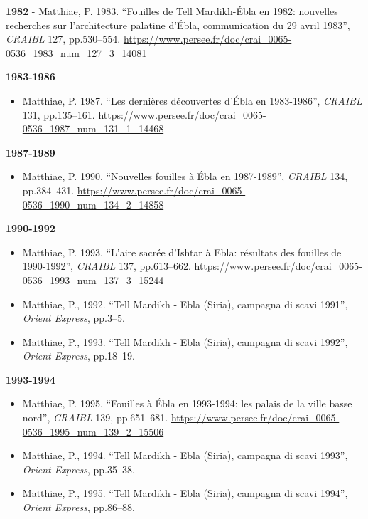 \documentclass[
]{book}
\providecommand{\tightlist}{%
  \setlength{\itemsep}{0pt}\setlength{\parskip}{0pt}}
\begin{document}
\textbf{1982}
- Matthiae, P. 1983. ``Fouilles de Tell Mardikh-Ébla en 1982: nouvelles recherches sur l'architecture palatine d'Ébla, communication du 29 avril 1983'', \emph{CRAIBL} 127, pp.530--554. \url{https://www.persee.fr/doc/crai_0065-0536_1983_num_127_3_14081}

\textbf{1983-1986}

\begin{itemize}
\tightlist
\item
  Matthiae, P. 1987. ``Les dernières découvertes d'Ébla en 1983-1986'', \emph{CRAIBL} 131, pp.135--161. \url{https://www.persee.fr/doc/crai_0065-0536_1987_num_131_1_14468}
\end{itemize}

\textbf{1987-1989}

\begin{itemize}
\tightlist
\item
  Matthiae, P. 1990. ``Nouvelles fouilles à Ébla en 1987-1989'', \emph{CRAIBL} 134, pp.384--431. \url{https://www.persee.fr/doc/crai_0065-0536_1990_num_134_2_14858}
\end{itemize}

\textbf{1990-1992}

\begin{itemize}
\tightlist
\item
  Matthiae, P. 1993. ``L'aire sacrée d'Ishtar à Ebla: résultats des fouilles de 1990-1992'', \emph{CRAIBL} 137, pp.613--662. \url{https://www.persee.fr/doc/crai_0065-0536_1993_num_137_3_15244}
\item
  Matthiae, P., 1992. ``Tell Mardikh - Ebla (Siria), campagna di scavi 1991'', \emph{Orient Express}, pp.3--5.
\item
  Matthiae, P., 1993. ``Tell Mardikh - Ebla (Siria), campagna di scavi 1992'', \emph{Orient Express}, pp.18--19.
\end{itemize}

\textbf{1993-1994}

\begin{itemize}
\tightlist
\item
  Matthiae, P. 1995. ``Fouilles à Ébla en 1993-1994: les palais de la ville basse nord'', \emph{CRAIBL} 139, pp.651--681. \url{https://www.persee.fr/doc/crai_0065-0536_1995_num_139_2_15506}
\item
  Matthiae, P., 1994. ``Tell Mardikh - Ebla (Siria), campagna di scavi 1993'', \emph{Orient Express}, pp.35--38.
\item
  Matthiae, P., 1995. ``Tell Mardikh - Ebla (Siria), campagna di scavi 1994'', \emph{Orient Express}, pp.86--88.
\end{itemize}
\end{document}
